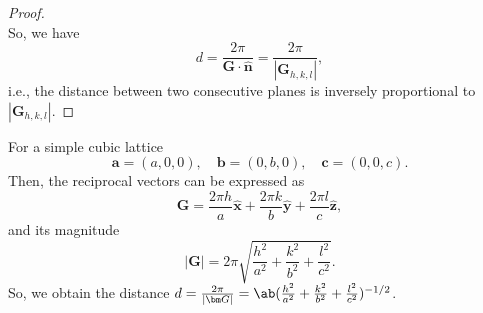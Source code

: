 \begin{solution}
\begin{enumext}
\begin{proof}
\[    \]
    So, we have
    \[
      d = \frac{2\pi}{\bm G \cdot \bm{\hat n}} = \frac{2\pi}{|\bm G_{h,k,l}|},
    \]
    i.e., the distance between two consecutive planes is inversely proportional
    to $|\bm G_{h,k,l}|$.
    \end{proof}
    \item For a simple cubic lattice
    \[
      \bm a = (a,0,0), \quad \bm b = (0,b,0), \quad \bm c = (0,0,c).
    \]
    Then, the reciprocal vectors can be expressed as
    \[
      \bm G = \frac{2\pi h}{a} \bm{\hat x} +
              \frac{2\pi k}{b} \bm{\hat y} +
              \frac{2\pi l}{c} \bm{\hat z},
    \]
    and its magnitude
    \[
      |\bm G| = 2\pi \sqrt{\frac{h^2}{a^2} + \frac{k^2}{b^2} + \frac{l^2}{c^2}}.
    \]
    So, we obtain the distance $d = \frac{2\pi}{|\bm G|}
    = \ab(\frac{h^2}{a^2} + \frac{k^2}{b^2} + \frac{l^2}{c^2})^{-1/2}$.
  \end{enumext}
\end{solution}

